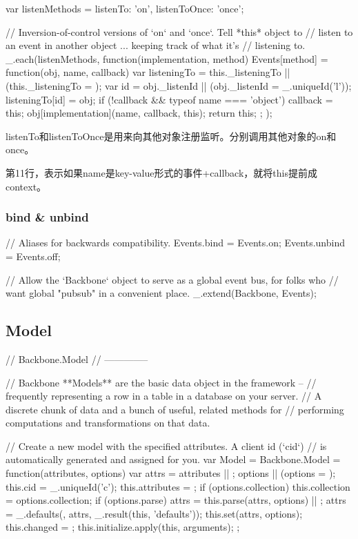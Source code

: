 \begin{JavaScript}
  var listenMethods = {listenTo: 'on', listenToOnce: 'once'};

  // Inversion-of-control versions of `on` and `once`. Tell *this* object to
  // listen to an event in another object ... keeping track of what it's
  // listening to.
  _.each(listenMethods, function(implementation, method) {
    Events[method] = function(obj, name, callback) {
      var listeningTo = this._listeningTo || (this._listeningTo = {});
      var id = obj._listenId || (obj._listenId = _.uniqueId('l'));
      listeningTo[id] = obj;
      if (!callback && typeof name === 'object') callback = this;
      obj[implementation](name, callback, this);
      return this;
    };
  });
\end{JavaScript}

listenTo和listenToOnce是用来向其他对象注册监听。分别调用其他对象的on和once。

第11行，表示如果name是key-value形式的事件+callback，就将this提前成context。

\subsubsection{bind \& unbind}

\begin{JavaScript}
  // Aliases for backwards compatibility.
  Events.bind   = Events.on;
  Events.unbind = Events.off;
\end{JavaScript}


\begin{JavaScript}
  // Allow the `Backbone` object to serve as a global event bus, for folks who
  // want global "pubsub" in a convenient place.
  _.extend(Backbone, Events);
\end{JavaScript}

\subsection{Model}

\begin{JavaScript}
  // Backbone.Model
  // --------------

  // Backbone **Models** are the basic data object in the framework --
  // frequently representing a row in a table in a database on your server.
  // A discrete chunk of data and a bunch of useful, related methods for
  // performing computations and transformations on that data.

  // Create a new model with the specified attributes. A client id (`cid`)
  // is automatically generated and assigned for you.
  var Model = Backbone.Model = function(attributes, options) {
    var attrs = attributes || {};
    options || (options = {});
    this.cid = _.uniqueId('c');
    this.attributes = {};
    if (options.collection) this.collection = options.collection;
    if (options.parse) attrs = this.parse(attrs, options) || {};
    attrs = _.defaults({}, attrs, _.result(this, 'defaults'));
    this.set(attrs, options);
    this.changed = {};
    this.initialize.apply(this, arguments);
  };
\end{JavaScript}

